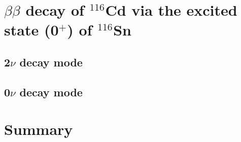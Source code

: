 \documentclass[main.tex]{subfiles}
\begin{document}
\FloatBarrier


\section{$\beta\beta$ decay of $^{\text{116}}$Cd via the excited state (0$^+$) of $^{\text{116}}$Sn}\label{sec:Result0PLUS}

\subsection{2$\nu$ decay mode}

\subsection{0$\nu$ decay mode}

\section{Summary}\label{sec:SummaryAnalysis}
\end{document}
